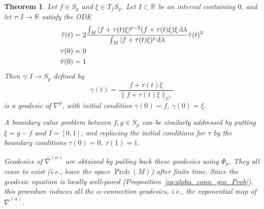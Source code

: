 \documentclass[11pt]{amsart}
\newtheorem{theorem}{Theorem}[section]
\theoremstyle{definition}
\newcommand{\R}{\mathbb R}
\newcommand{\dx}{\lambda}
\newcommand{\Prob}{\operatorname{Prob}(M)}
\newcommand{\ud}{\textup{d}}
\begin{document}
\begin{theorem}\label{prop:alpha-geod-prob}
    Let $f\in S_p$ and $\xi\in T_f S_p$.
    Let $I\subset \R$ be an interval containing $0$, and let $\tau:I\to \R$ satisfy the ODE
    \[
    \begin{split}
    \ddot\tau(t) &= 2\frac{\int_M |f + \tau(t) \xi|^{p-2}(f + \tau(t) \xi)\xi\,\ud\dx}{\int_M|f + \tau(t) \xi|^p\,\ud\dx}\dot\tau(t)^2 \\
    \tau(0) &= 0 \\
    \dot\tau(0) &= 1
    \end{split}
    \]
    Then $\gamma:I\to S_p$ defined by
    \[
    \gamma(t) = \frac{f + \tau(t)\xi}{\|f+\tau(t)\xi\|_{L^p}}
    \]
    is a geodesic of $\nabla^p$, with initial condition $\gamma(0) = f$, $\dot\gamma(0) = \xi$.
    
    A boundary value problem between $f,g\in S_p$ can be similarly addressed by putting $\xi = g-f$ and $I=[0,1]$, and replacing the initial conditions for $\tau$ by the boundary conditions $\tau(0)=0$, $\tau(1)=1$.

    Geodesics of $\overline{\nabla}^{(\alpha)}$ are obtained by pulling back these geodesics using $\Phi_p$.
    They all cease to exist (i.e., leave the space $\Prob$) after finite time.
    Since the geodesic equation is locally well-posed (Proposition~\ref{eq:alpha_conn_geo_Prob}), this procedure induces all the $\alpha$-connection geodesics, i.e., the exponential map of $\overline{\nabla}^{(\alpha)}$.
\end{theorem}
\end{document}
